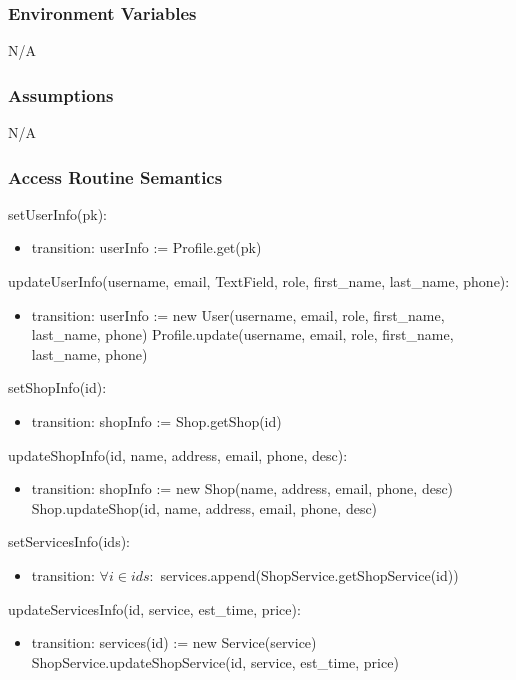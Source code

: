 \documentclass[12pt, titlepage]{article}
\begin{document}
        \subsubsection{Environment Variables}
        N/A
        \subsubsection{Assumptions}
        N/A
        \subsubsection{Access Routine Semantics}
            \noindent setUserInfo(pk):
            \begin{itemize}
                \item transition: userInfo := Profile.get(pk)
            \end{itemize}
            \noindent updateUserInfo(username, email, TextField, role, first\_name, last\_name, phone):
            \begin{itemize}
                \item transition: userInfo := new User(username, email, role, first\_name, last\_name, phone) \newline Profile.update(username, email, role, first\_name, last\_name, phone)
            \end{itemize}
            \noindent setShopInfo(id):
            \begin{itemize}
                \item transition: shopInfo := Shop.getShop(id)
            \end{itemize}
            \noindent updateShopInfo(id, name, address, email, phone, desc):
            \begin{itemize}
                \item transition: shopInfo := new Shop(name, address, email, phone, desc) \newline Shop.updateShop(id, name, address, email, phone, desc)
            \end{itemize}
            \noindent setServicesInfo(ids):
            \begin{itemize}
                \item transition: $\forall i \in ids : $ services.append(ShopService.getShopService(id))
            \end{itemize}
            \noindent updateServicesInfo(id, service, est\_time, price):
            \begin{itemize}
                \item transition: services(id) := new Service(service) \newline ShopService.updateShopService(id, service, est\_time, price)
            \end{itemize}
\end{document}
